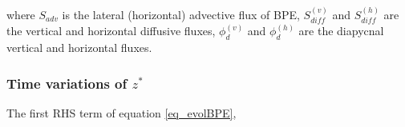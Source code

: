 where $S_{adv}$ is the lateral (horizontal) advective flux of BPE, $S^{(v)}_{diff}$ and $S^{(h)}_{diff}$ are the vertical and horizontal diffusive fluxes, $\phi^{(v)}_d$ and $\phi^{(h)}_d$ are the diapycnal vertical and horizontal fluxes.

\subsubsection{Time variations of $z^*$}
The first RHS term of equation \ref{eq_evolBPE}, 

